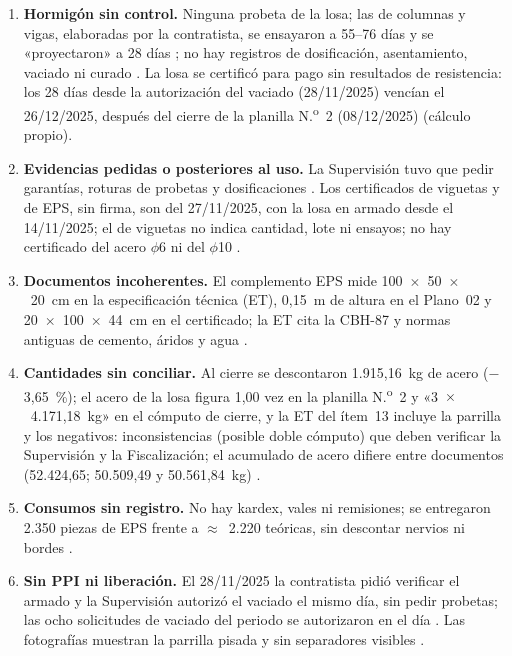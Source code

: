 \begin{enumerate}[label=\textbf{B\arabic*.},leftmargin=1.3cm]
  \item \textbf{Hormigón sin control.} Ninguna probeta de la losa; las de columnas y vigas, elaboradas por la contratista, se ensayaron a 55--76 días y se «proyectaron» a 28 días \parencite{labuatf2025}; no hay registros de dosificación, asentamiento, vaciado ni curado \parencite[p.~76]{uatf2025pao2}. La losa se certificó para pago sin resultados de resistencia: los 28 días desde la autorización del vaciado (28/11/2025) vencían el 26/12/2025, después del cierre de la planilla N.\textsuperscript{o}~2 (08/12/2025) (cálculo propio).
  \item \textbf{Evidencias pedidas o posteriores al uso.} La Supervisión tuvo que pedir garantías, roturas de probetas y dosificaciones \parencite[p.~9]{uatf2025pao2}. Los certificados de viguetas y de EPS, sin firma, son del 27/11/2025, con la losa en armado desde el 14/11/2025; el de viguetas no indica cantidad, lote ni ensayos; no hay certificado del acero $\phi$6 ni del $\phi$10 \parencite[pp.~80--86, 122]{uatf2025pao2}.
  \item \textbf{Documentos incoherentes.} El complemento EPS mide 100~$\times$~50~$\times$~20~cm en la especificación técnica (ET), 0,15~m de altura en el Plano~02 y 20~$\times$~100~$\times$~44~cm en el certificado; la ET cita la CBH-87 y normas antiguas de cemento, áridos y agua \parencite[pp.~1--3]{uatf_et}.
  \item \textbf{Cantidades sin conciliar.} Al cierre se descontaron 1.915,16~kg de acero ($-$3,65~\%); el acero de la losa figura 1,00 vez en la planilla N.\textsuperscript{o}~2 y «3~$\times$~4.171,18~kg» en el cómputo de cierre, y la ET del ítem~13 incluye la parrilla y los negativos: inconsistencias (posible doble cómputo) que deben verificar la Supervisión y la Fiscalización; el acumulado de acero difiere entre documentos (52.424,65; 50.509,49 y 50.561,84~kg) \parencites[pp.~19--20]{uatf2025pao2}{uatf_pao3}[p.~12]{uatf_item13}.
  \item \textbf{Consumos sin registro.} No hay kardex, vales ni remisiones; se entregaron 2.350 piezas de EPS frente a $\approx$~2.220 teóricas, sin descontar nervios ni bordes \parencite{unicon2025}.
  \item \textbf{Sin PPI ni liberación.} El 28/11/2025 la contratista pidió verificar el armado y la Supervisión autorizó el vaciado el mismo día, sin pedir probetas; las ocho solicitudes de vaciado del periodo se autorizaron en el día \parencite[pp.~114--125]{uatf2025pao2}. Las fotografías muestran la parrilla pisada y sin separadores visibles \parencite[p.~76]{uatf2025pao2}.

\end{enumerate}
